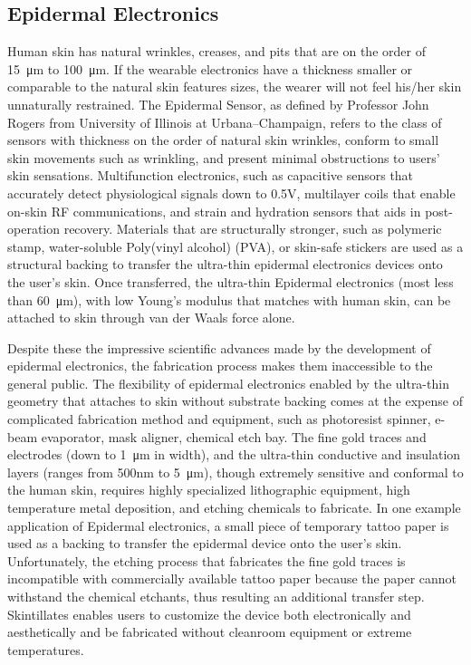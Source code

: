 \documentclass{sigchi}
\begin{document}
\subsection{Epidermal Electronics}
Human skin has natural wrinkles, creases, and pits that are on the order of \SI{15}{\micro\metre} to \SI{100}{\micro\metre}\cite{Tchvialeva:2014wla}. If the wearable electronics have a thickness smaller or comparable to the natural skin features sizes, the wearer will not feel his/her skin unnaturally restrained\cite{Kim:2011bv}. The Epidermal Sensor, as defined by Professor John Rogers from University of Illinois at Urbana–Champaign, refers to the class of sensors with thickness on the order of natural skin wrinkles, conform to small skin movements such as wrinkling, and present minimal obstructions to users’ skin sensations\cite{Kim:2011bv}. Multifunction electronics, such as capacitive sensors that accurately detect physiological signals down to 0.5V, multilayer coils that enable on-skin RF communications, and strain and hydration sensors that aids in post-operation recovery\cite{Jeong:2013km,Kim:2014iq,Bandodkar:2014dl,Kim:2011bv}. %
Materials that are structurally stronger, such as polymeric stamp, water-soluble Poly(vinyl alcohol) (PVA), or skin-safe stickers are used as a structural backing to transfer the ultra-thin epidermal electronics devices onto the user's skin\cite{Son:2014iya}. Once transferred, the ultra-thin Epidermal electronics (most less than \SI{60}{\micro\metre}), with low Young's modulus that matches with human skin, can be attached to skin through van der Waals force alone\cite{Son:2014iya,Kim:2011bv}. 

Despite these the impressive scientific advances made by the development of epidermal electronics, the fabrication process makes them inaccessible to the general public. The flexibility of epidermal electronics enabled by the ultra-thin geometry that attaches to skin without substrate backing comes at the expense of complicated fabrication method and equipment, such as photoresist spinner, e-beam evaporator, mask aligner, chemical etch bay. The fine gold traces and electrodes (down to \SI{1}{\micro\metre} in width), and the ultra-thin conductive and insulation layers (ranges from 500nm to 5\SI{}{\micro\metre}), though extremely sensitive and conformal to the human skin, requires highly specialized lithographic equipment, high temperature metal deposition, and etching chemicals to fabricate\cite{Kim:2011bv,Kim:2014iq}. In one example application of Epidermal electronics, a small piece of temporary tattoo paper is used as a backing to transfer the epidermal device onto the user's skin\cite{Kim:2011bv}. Unfortunately, the etching process that fabricates the fine gold traces is incompatible with commercially available tattoo paper because the paper cannot withstand the chemical etchants, thus resulting an additional transfer step. Skintillates enables users to customize the device both electronically and aesthetically and be fabricated without cleanroom equipment or extreme temperatures. 
\end{document}
